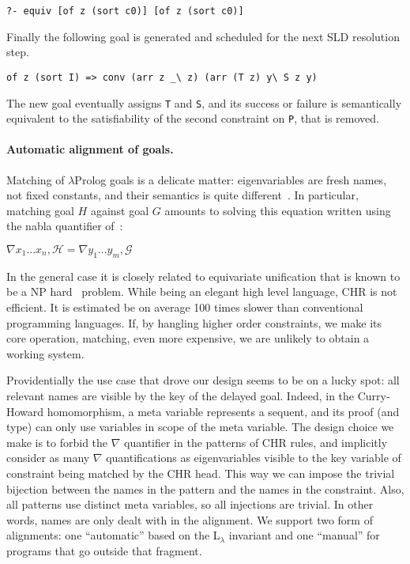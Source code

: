 \documentclass{easychair}
\begin{document}
\begin{Verbatim}
?- equiv [of z (sort c0)] [of z (sort c0)]
\end{Verbatim}

Finally the following  goal is generated and scheduled for the next
SLD resolution step.

\begin{Verbatim}
of z (sort I) => conv (arr z _\ z) (arr (T z) y\ S z y)
\end{Verbatim}

The new goal eventually assigns \verb+T+ and \verb+S+, and its success
or failure is semantically equivalent to the satisfiability of the
second constraint on \verb+P+, that is removed.

\paragraph{Automatic alignment of goals.}
\label{sec:realchr}

Matching of $\lambda$Prolog goals is a delicate matter: eigenvariables
are fresh names, not fixed constants, and their semantics is quite
different~\cite{nabla}.  
In particular, matching goal $H$ against goal $G$ amounts
to solving this equation written using the nabla quantifier of~\cite{nabla}:

\begin{math}
 \nabla x_1\ldots x_n, \mathcal{H} = \nabla y_1\ldots y_m, \mathcal{G}
\end{math}

In the general case it is closely related to equivariate unification
that is known to be a NP hard~\cite{Cheney2004} problem.  While being
an elegant high level language, CHR is not efficient.  It is estimated
be on average 100 times slower than conventional programming
languages.  If, by hangling higher order constraints, we make its core
operation, matching, even more expensive, we are unlikely to obtain a
working system.

Providentially the use case that drove our design seems to be on a lucky
spot: all relevant names are visible by the key of the delayed goal.
Indeed, in the Curry-Howard homomorphism, a meta variable represents a
sequent, and its proof (and type) can only use variables in scope of
the meta variable.  The design choice we make is to forbid the
$\nabla$ quantifier in the patterns of CHR rules, and implicitly consider as many
$\nabla$ quantifications as eigenvariables visible to the key variable
of constraint being matched by the CHR head.  This way we can impose
the trivial bijection between the names in the pattern and the names
in the constraint.  Also, all patterns use distinct meta variables, so
all injections are trivial.  In other words, names are only dealt with
in the alignment.
We support two form of alignments: one ``automatic'' based on the
L$_\lambda$ invariant and one ``manual'' for programs that go
outside that fragment.
\end{document}
